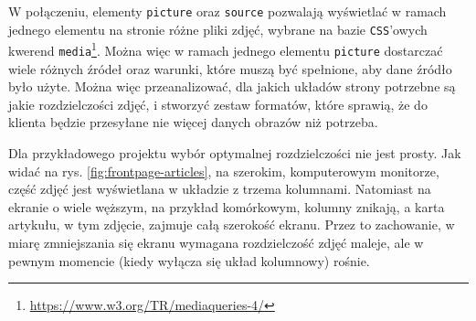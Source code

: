\documentclass[licencjacka]{pracadypl}
\begin{document}
W połączeniu, elementy \texttt{picture} oraz \texttt{source} pozwalają wyświetlać w ramach jednego elementu na stronie różne pliki zdjęć, wybrane na bazie \texttt{CSS}'owych kwerend \texttt{media}\footnote{\url{https://www.w3.org/TR/mediaqueries-4/}}. Można więc w ramach jednego elementu \texttt{picture} dostarczać wiele różnych źródeł oraz warunki, które muszą być spełnione, aby dane źródło było użyte. Można więc przeanalizować, dla jakich układów strony potrzebne są jakie rozdzielczości zdjęć, i stworzyć zestaw formatów, które sprawią, że do klienta będzie przesyłane nie więcej danych obrazów niż potrzeba.

Dla przykładowego projektu wybór optymalnej rozdzielczości nie jest prosty. Jak widać na rys. \ref{fig:frontpage-articles}, na szerokim, komputerowym monitorze, część zdjęć jest wyświetlana w układzie z trzema kolumnami. Natomiast na ekranie o wiele węższym, na przykład komórkowym, kolumny znikają, a karta artykułu, w tym zdjęcie, zajmuje całą szerokość ekranu. Przez to zachowanie, w miarę zmniejszania się ekranu wymagana rozdzielczość zdjęć maleje, ale w pewnym momencie (kiedy wyłącza się układ kolumnowy) rośnie.
\end{document}
